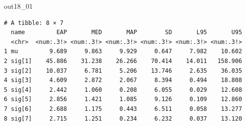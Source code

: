 \begin{MCMCout}{}{out18_01}
	\begin{verbatim}
# A tibble: 8 × 7
  name         EAP       MED       MAP        SD       L95       U95
  <chr>  <num:.3!> <num:.3!> <num:.3!> <num:.3!> <num:.3!> <num:.3!>
1 mu         9.689     9.863     9.929     0.647     7.982    10.602
2 sig[1]    45.886    31.238    26.266    70.414    14.011   158.906
3 sig[2]    10.037     6.781     5.206    13.746     2.635    36.035
4 sig[3]     4.609     2.872     2.067     8.394     0.494    18.808
5 sig[4]     2.442     1.060     0.208     6.055     0.029    12.608
6 sig[5]     2.856     1.421     1.085     9.126     0.109    12.860
7 sig[6]     2.688     1.175     0.443     6.511     0.058    13.277
8 sig[7]     2.715     1.251     0.234     6.232     0.037    13.120
\end{verbatim}
\end{MCMCout}
